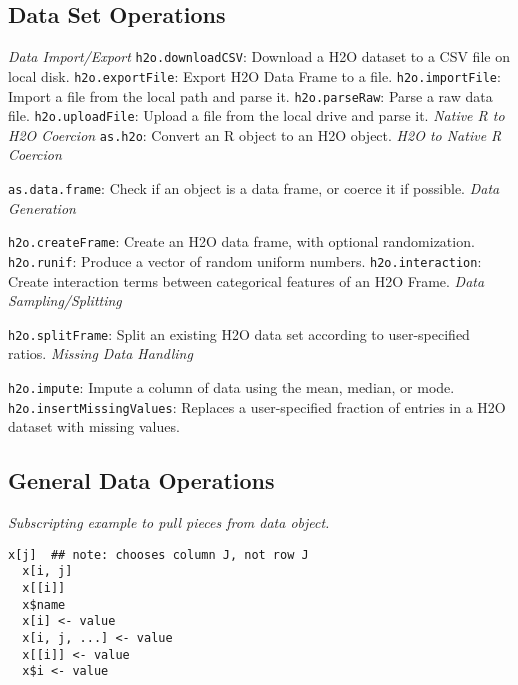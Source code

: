 {{\subsection {Data Set Operations}
\bgroup\obeylines %

{\emph{Data Import/Export}}
{\texttt{h2o.downloadCSV}}: Download a H2O dataset to a CSV file on local disk.
{\texttt{h2o.exportFile}}: Export H2O Data Frame to a file.
{\texttt{h2o.importFile}}: Import a file from the local path and parse it. 
{\texttt{h2o.parseRaw}}: Parse a raw data file.  
{\texttt{h2o.uploadFile}}: Upload a file from the local drive and parse it. 
\medskip
{\emph{Native R to H2O Coercion}}\smallskip
 {\texttt{as.h2o}}: Convert an R object to an H2O object. 
\medskip
\emph{H2O to Native R Coercion}\par
{\texttt{as.data.frame}}: Check if an object is a data frame, or coerce it if possible. 
\medskip
\emph{Data Generation}\par
{\texttt{h2o.createFrame}}: Create an H2O data frame, with optional randomization. 
{\texttt{h2o.runif}}: Produce a vector of random uniform numbers. 
{\texttt{h2o.interaction}}: Create interaction terms between categorical features of an H2O Frame. 
\medskip
\emph{Data Sampling/Splitting}\par
{\texttt{h2o.splitFrame}: Split an existing H2O data set according to user-specified ratios. 
\newpage
\emph{Missing Data Handling}\par
{\texttt{h2o.impute}}: Impute a column of data using the mean, median, or mode. 
{\texttt{h2o.insertMissingValues}}: Replaces a user-specified fraction of entries in a H2O dataset with missing values. 

\subsection{General Data Operations}

\emph{Subscripting example to pull pieces from data object.} 
\begin{lstlisting}[style=R]
  x[j]  ## note: chooses column J, not row J
  x[i, j]
  x[[i]]
  x$name 
  x[i] <- value
  x[i, j, ...] <- value
  x[[i]] <- value
  x$i <- value
\end{lstlisting}

}}}
